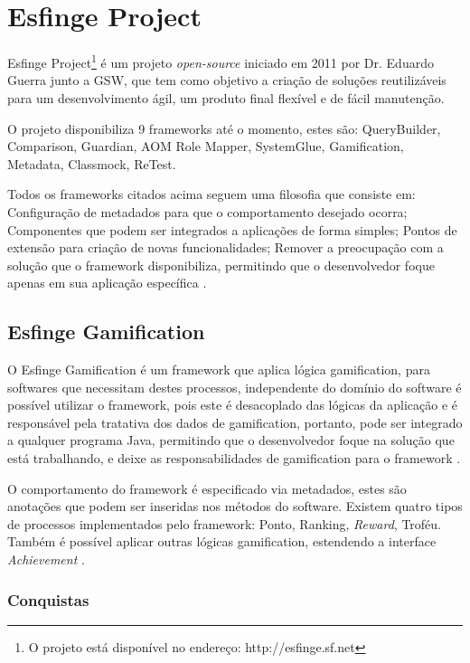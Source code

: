 \section{Esfinge Project}

\par Esfinge Project\footnote{O projeto está disponível no endereço: http://esfinge.sf.net} é um projeto \textit{open-source} iniciado em 2011 por Dr. Eduardo Guerra junto a GSW, que tem como objetivo a criação de soluções reutilizáveis para um desenvolvimento ágil, um produto final flexível e de fácil manutenção.
\par O projeto disponibiliza 9 frameworks até o momento, estes são: QueryBuilder, Comparison, Guardian, AOM Role Mapper, SystemGlue, Gamification, Metadata, Classmock, ReTest.
\par Todos os frameworks citados acima seguem uma filosofia que consiste em: Configuração de metadados para que o comportamento desejado ocorra; Componentes que podem ser integrados a aplicações de forma simples; Pontos de extensão para criação de novas funcionalidades; Remover a preocupação com a solução que o framework disponibiliza, permitindo que o desenvolvedor foque apenas em sua aplicação específica \cite{esfinge2011}.

\subsection{Esfinge Gamification}

\par O Esfinge Gamification é um framework que aplica lógica gamification, para softwares que necessitam destes processos, independente do domínio do software é possível utilizar o framework, pois este é desacoplado das lógicas da aplicação e é responsável pela tratativa dos dados de gamification, portanto, pode ser integrado a qualquer programa Java, permitindo que o desenvolvedor foque na solução que está trabalhando, e deixe as responsabilidades de gamification para o framework  \cite{esfinge2011}.
\par O comportamento do framework é especificado via metadados, estes são anotações que podem ser inseridas nos métodos do software. Existem quatro tipos de processos implementados pelo framework: Ponto, Ranking, \textit{Reward}, Troféu. Também é possível aplicar outras lógicas gamification, estendendo a interface \textit{Achievement} \cite{esfinge2011}.

\subsubsection{Conquistas}

